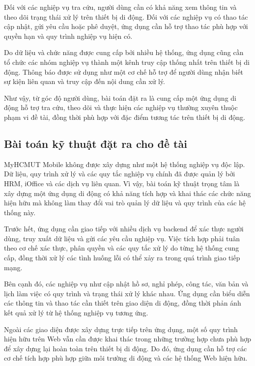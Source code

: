 Đối với các nghiệp vụ tra cứu, người dùng cần có khả năng xem thông tin và theo dõi trạng thái xử lý trên thiết bị di động. Đối với các nghiệp vụ có thao tác cập nhật, gửi yêu cầu hoặc phê duyệt, ứng dụng cần hỗ trợ thao tác phù hợp với quyền hạn và quy trình nghiệp vụ hiện có.

Do dữ liệu và chức năng được cung cấp bởi nhiều hệ thống, ứng dụng cũng cần tổ chức các nhóm nghiệp vụ thành một kênh truy cập thống nhất trên thiết bị di động. Thông báo được sử dụng như một cơ chế hỗ trợ để người dùng nhận biết sự kiện liên quan và truy cập đến nội dung cần xử lý.

Như vậy, từ góc độ người dùng, bài toán đặt ra là cung cấp một ứng dụng di động hỗ trợ tra cứu, theo dõi và thực hiện các nghiệp vụ thường xuyên thuộc phạm vi đề tài, đồng thời phù hợp với đặc điểm tương tác trên thiết bị di động.

\subsection{Bài toán kỹ thuật đặt ra cho đề tài}
\label{subsec:baitoan_kythuat}

MyHCMUT Mobile không được xây dựng như một hệ thống nghiệp vụ độc lập. Dữ liệu, quy trình xử lý và các quy tắc nghiệp vụ chính đã được quản lý bởi HRM, iOffice và các dịch vụ liên quan. Vì vậy, bài toán kỹ thuật trọng tâm là xây dựng một ứng dụng di động có khả năng tích hợp và khai thác các chức năng hiện hữu mà không làm thay đổi vai trò quản lý dữ liệu và quy trình của các hệ thống này.

Trước hết, ứng dụng cần giao tiếp với nhiều dịch vụ backend để xác thực người dùng, truy xuất dữ liệu và gửi các yêu cầu nghiệp vụ. Việc tích hợp phải tuân theo cơ chế xác thực, phân quyền và các quy tắc xử lý do từng hệ thống cung cấp, đồng thời xử lý các tình huống lỗi có thể xảy ra trong quá trình giao tiếp mạng.

Bên cạnh đó, các nghiệp vụ như cập nhật hồ sơ, nghỉ phép, công tác, văn bản và lịch làm việc có quy trình và trạng thái xử lý khác nhau. Ứng dụng cần biểu diễn các thông tin và thao tác cần thiết trên giao diện di động, đồng thời phản ánh kết quả xử lý từ hệ thống nghiệp vụ tương ứng.

Ngoài các giao diện được xây dựng trực tiếp trên ứng dụng, một số quy trình hiện hữu trên Web vẫn cần được khai thác trong những trường hợp chưa phù hợp để xây dựng lại hoàn toàn trên thiết bị di động. Do đó, ứng dụng cần hỗ trợ các cơ chế tích hợp phù hợp giữa môi trường di động và các hệ thống Web hiện hữu.

